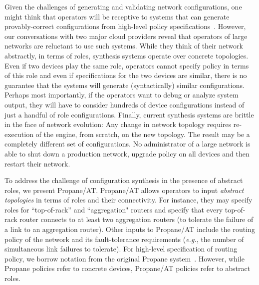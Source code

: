 \documentclass[numbers, 10pt, preprint]{sigplanconf}
\newcommand{\EG}{\emph{e.g.}}
\newcommand{\sysname}{{\text{}\small \sf Propane/AT}\xspace}
\newcommand{\Propane}{{\text{}\small \sf Propane}\xspace}
\begin{document}

Given the challenges of generating and validating network configurations, one
might think that operators will be receptive to systems that can generate
provably-correct configurations from high-level policy
specifications~\cite{narain+:configassure,propane,synet-synthesis}. However, our conversations
with two major cloud providers reveal that operators of large networks are
reluctant to use such systems. While they think of their network abstractly, in
terms of roles, synthesis systems operate over concrete topologies.  
Even if two devices play the same role, operators cannot specify policy in terms of
this role and even if specifications for the two devices are similar,
there is no guarantee that the systems will generate (syntactically) similar
configurations.  Perhaps most importantly, if the operators want to debug or analyze system output, they
will have to consider hundreds of device configurations instead of just a handful of
role configurations. Finally, current synthesis systems are brittle in the face of network
evolution: Any change in network topology requires re-execution of the engine,
from scratch, on the new topology.  The result may be a completely different
set of configurations.  No administrator of a large network is
able to shut down a production network, upgrade policy on all devices and 
then restart their network.

To address the challenge of configuration synthesis in the presence of abstract roles, we present \sysname. 
\sysname
allows operators to input \emph{abstract topologies} in terms of roles
and their connectivity. For instance, they may specify roles for ``top-of-rack''
and ``aggregation" routers and specify that every top-of-rack router connects to
at least two aggregation routers (to tolerate the failure of a link to an
aggregation router). Other inputs to \sysname include the routing policy of the
network and its fault-tolerance requirements (\EG, the number of simultaneous link failures
to tolerate). For high-level specification of routing policy, we borrow notation from the original
\Propane system~\cite{propane}.  However, while \Propane policies refer to concrete devices,
\sysname policies refer to abstract roles.
\end{document}
